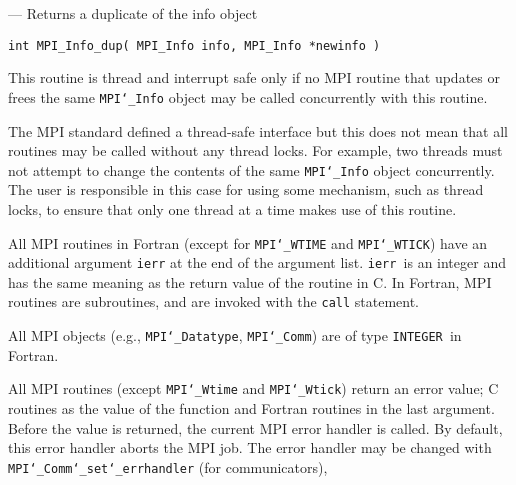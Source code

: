 \startmanpage
{}
--- Returns a duplicate of the info object 
\startvb\begin{verbatim}
int MPI_Info_dup( MPI_Info info, MPI_Info *newinfo )

\end{verbatim}
\endvb

\par
{}
\par
\par
{}
\par
This routine is thread and interrupt safe only if no MPI routine that
updates or frees the same {\tt MPI{\tt \char`\_}Info} object may be called concurrently
with this routine.
\par
The MPI standard defined a thread-safe interface but this does not
mean that all routines may be called without any thread locks.  For
example, two threads must not attempt to change the contents of the
same {\tt MPI{\tt \char`\_}Info} object concurrently.  The user is responsible in this
case for using some mechanism, such as thread locks, to ensure that
only one thread at a time makes use of this routine.
\par
{}
All MPI routines in Fortran (except for {\tt MPI{\tt \char`\_}WTIME} and {\tt MPI{\tt \char`\_}WTICK}) have
an additional argument {\tt ierr} at the end of the argument list.  {\tt ierr
}is an integer and has the same meaning as the return value of the routine
in C.  In Fortran, MPI routines are subroutines, and are invoked with the
{\tt call} statement.
\par
All MPI objects (e.g., {\tt MPI{\tt \char`\_}Datatype}, {\tt MPI{\tt \char`\_}Comm}) are of type {\tt INTEGER
}in Fortran.
\par
{}
\par
All MPI routines (except {\tt MPI{\tt \char`\_}Wtime} and {\tt MPI{\tt \char`\_}Wtick}) return an error value;
C routines as the value of the function and Fortran routines in the last
argument.  Before the value is returned, the current MPI error handler is
called.  By default, this error handler aborts the MPI job.  The error handler
may be changed with {\tt MPI{\tt \char`\_}Comm{\tt \char`\_}set{\tt \char`\_}errhandler} (for communicators),
